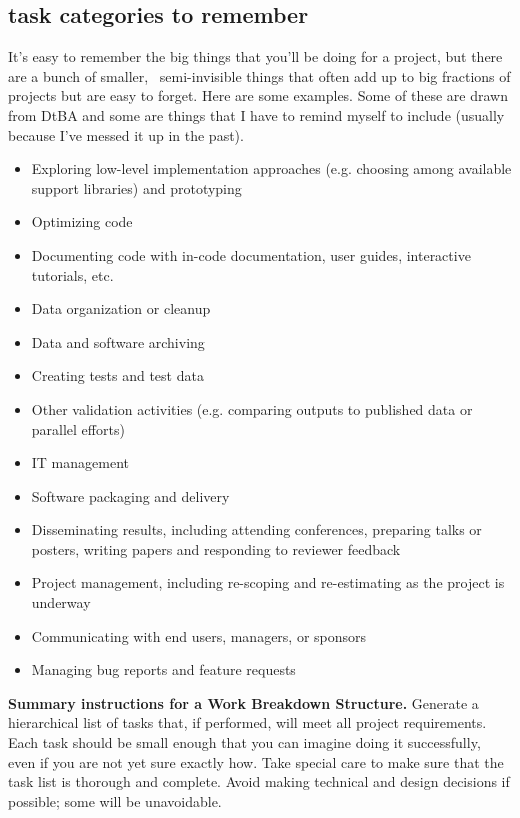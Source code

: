 \documentclass[12pt,oneside]{book}
\begin{document}
\subsection*{task categories to remember}

It's easy to remember the big things that you'll be doing for a project, but there are a bunch of smaller,  semi-invisible things that often add up to big fractions of projects but are easy to forget. Here are some examples. Some of these are drawn from DtBA and some are things that I have to remind myself to include (usually because I've messed it up in the past).
\begin{itemize}[wide, labelwidth=!, labelindent=0pt]
\item Exploring low-level implementation approaches (e.g. choosing among available support libraries) and prototyping
\item Optimizing code
\item Documenting code with in-code documentation, user guides, interactive tutorials, etc.
\item Data organization or cleanup
\item Data and software archiving
\item Creating tests and test data
\item Other validation activities (e.g. comparing outputs to published data or parallel efforts)
\item IT management
\item Software packaging and delivery
\item Disseminating results, including attending conferences, preparing talks or posters, writing papers and responding to reviewer feedback
\item Project management, including re-scoping and re-estimating as the project is underway
\item Communicating with end users, managers, or sponsors
\item Managing bug reports and feature requests
\end{itemize}

\hfill
\begin{mdframed}[everyline=true]
\textbf{Summary instructions for a Work Breakdown Structure.} Generate a hierarchical list of tasks that, if performed, will meet all project requirements. Each task should be small enough that you can imagine doing it successfully, even if you are not yet sure exactly how. Take special care to make sure that the task list is thorough and complete. Avoid making technical and design decisions if possible; some will be unavoidable.
\end{mdframed}
\end{document}
